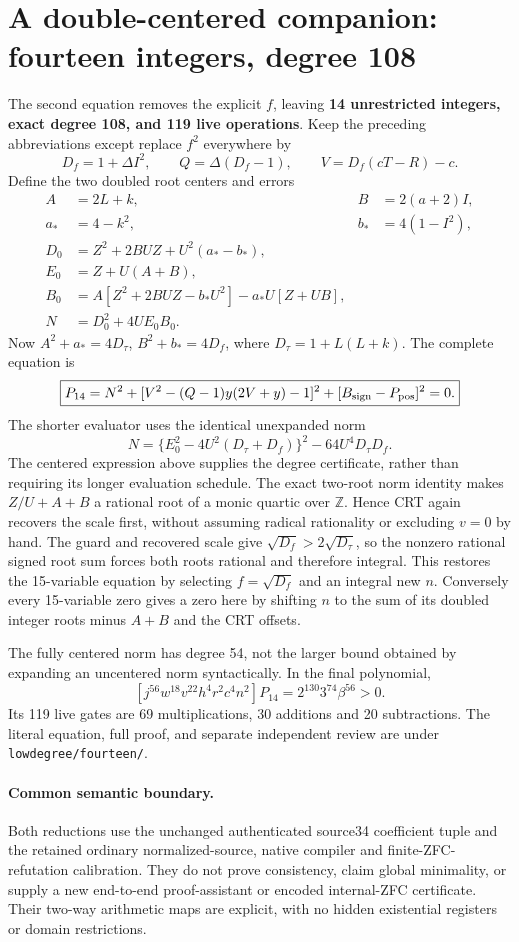 \section{A double-centered companion: fourteen integers, degree 108}
\label{sec:double-carrier}
The second equation removes the explicit $f$, leaving \textbf{14 unrestricted
integers, exact degree 108, and 119 live operations}.  Keep the preceding
abbreviations except replace $f^2$ everywhere by
\[
 D_f=1+\Delta I^2,\qquad Q=\Delta(D_f-1),\qquad
 V=D_f(cT-R)-c.
\]
Define the two doubled root centers and errors
\begin{align*}
 A&=2L+k,&B&=2(a+2)I,\\
 a_*&=4-k^2,&b_*&=4(1-I^2),\\
 D_0&=Z^2+2BUZ+U^2(a_*-b_*),\\
 E_0&=Z+U(A+B),\\
 B_0&=A[Z^2+2BUZ-b_*U^2]-a_*U[Z+UB],\\
 N&=D_0^2+4UE_0B_0.
\end{align*}
Now $A^2+a_*=4D_\tau$, $B^2+b_*=4D_f$, where
$D_\tau=1+L(L+k)$.  The complete equation is
\begin{equation}\label{eq:carrier14}
 \boxed{P_{14}=N^2+[V^2-(Q-1)y(2V+y)-1]^2+
 [B_{\rm sign}-P_{\rm pos}]^2=0.}
\end{equation}
The shorter evaluator uses the identical unexpanded norm
\[
 N=\{E_0^2-4U^2(D_\tau+D_f)\}^2-64U^4D_\tau D_f.
\]
The centered expression above supplies the degree certificate, rather than
requiring its longer evaluation schedule.
The exact two-root norm identity makes $Z/U+A+B$ a rational root of a monic
quartic over $\mathbb Z$.  Hence CRT again recovers the scale first, without
assuming radical rationality or excluding $v=0$ by hand.  The guard and
recovered scale give $\sqrt{D_f}>2\sqrt{D_\tau}$, so the nonzero rational
signed root sum forces both roots rational and therefore integral.  This
restores the 15-variable equation by selecting $f=\sqrt{D_f}$ and an integral
new $n$.  Conversely every 15-variable zero gives a zero here by shifting
$n$ to the sum of its doubled integer roots minus $A+B$ and the CRT offsets.

The fully centered norm has degree 54, not the larger bound obtained by
expanding an uncentered norm syntactically.  In the final polynomial,
\[
 [j^{56}w^{18}v^{22}h^4r^2c^4n^2]P_{14}
   =2^{130}3^{74}\beta^{56}>0.
\]
Its 119 live gates are 69 multiplications, 30 additions and 20 subtractions.
The literal equation, full proof, and separate independent review are under
\texttt{lowdegree/fourteen/}.

\paragraph{Common semantic boundary.}
Both reductions use the unchanged authenticated source34 coefficient tuple
and the retained ordinary normalized-source, native compiler and finite-ZFC-
refutation calibration.  They do not prove consistency, claim global
minimality, or supply a new end-to-end proof-assistant or encoded internal-ZFC
certificate.  Their two-way arithmetic maps are explicit, with no hidden
existential registers or domain restrictions.
